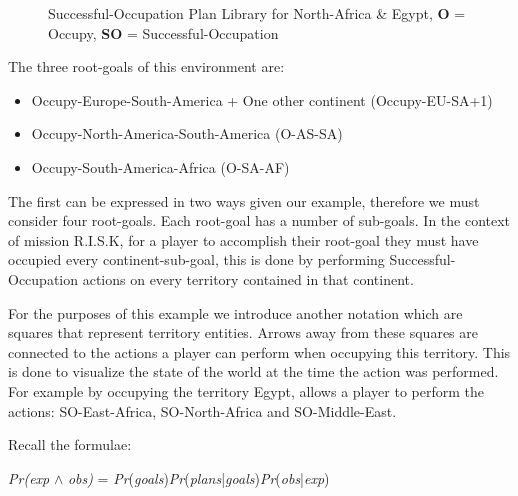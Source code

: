 \documentclass[parskip]{cs4rep}
\begin{document}
\begin{figure}[h]
\caption{Successful-Occupation Plan Library for North-Africa \& Egypt, \textbf{O} = Occupy, \textbf{SO} = Successful-Occupation}
\end{figure}

\newpage

The three root-goals of this environment are:

\begin{itemize}
\item
Occupy-Europe-South-America + One other continent (Occupy-EU-SA+1)
\item
Occupy-North-America-South-America (O-AS-SA)
\item
Occupy-South-America-Africa (O-SA-AF)
\end{itemize}

The first can be expressed in two ways given our example, therefore we must consider four root-goals. Each root-goal has a number of sub-goals. In the context of mission R.I.S.K, for a player to accomplish their root-goal they must have occupied every continent-sub-goal, this is done by performing Successful-Occupation actions on every territory contained in that continent. 

For the purposes of this example we introduce another notation which are squares that represent territory entities. Arrows away from these squares are connected to the actions a player can perform when occupying this territory. This is done to visualize the state of the world at the time the action was performed. For example by occupying the territory Egypt, allows a player to perform the actions: SO-East-Africa, SO-North-Africa and SO-Middle-East.

Recall the formulae:\newline

\centerline{
\textit{Pr(exp} $\wedge$ \textit{obs)} = \textit{Pr}(\textit{goals})\textit{Pr}(\textit{plans}|\textit{goals})\textit{Pr}(\textit{obs}|\textit{exp})
}
\end{document}
